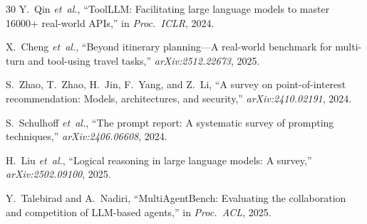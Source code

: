 \documentclass[journal]{IEEEtran}
\begin{document}
\begin{thebibliography}{30}
Y.~Qin \emph{et~al.}, ``ToolLLM: Facilitating large language models to master 16000+ real-world APIs,'' in \emph{Proc.\ ICLR}, 2024.

X.~Cheng \emph{et~al.}, ``Beyond itinerary planning---A real-world benchmark for multi-turn and tool-using travel tasks,'' \emph{arXiv:2512.22673}, 2025.

S.~Zhao, T.~Zhao, H.~Jin, F.~Yang, and Z.~Li, ``A survey on point-of-interest recommendation: Models, architectures, and security,'' \emph{arXiv:2410.02191}, 2024.

S.~Schulhoff \emph{et~al.}, ``The prompt report: A systematic survey of prompting techniques,'' \emph{arXiv:2406.06608}, 2024.

H.~Liu \emph{et~al.}, ``Logical reasoning in large language models: A survey,'' \emph{arXiv:2502.09100}, 2025.

Y.~Talebirad and A.~Nadiri, ``MultiAgentBench: Evaluating the collaboration and competition of LLM-based agents,'' in \emph{Proc.\ ACL}, 2025.

\end{thebibliography}
\end{document}
